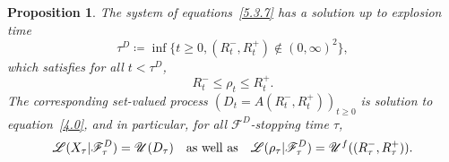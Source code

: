 \documentclass[JEP,XML,SOM,Unicode,NoFloatCountersInSection,published]{cedram}
\theoremstyle{plain}
\newtheorem{prop}[thm]{Proposition}
\theoremstyle{definition}
\newcommand{\SF}{{\mathscr F}}
\newcommand{\SL}{{\mathscr L}}
\newcommand{\SU}{{\mathscr U}}
\newcommand\df{\coloneqq}
\begin{document}
\begin{prop}
\label{P5.3.1}
The system of equations~\eqref{5.3.7} has a solution up to explosion time
\begin{equation}
\tau^D\df \inf\{t\ge 0, (R_t^-,R_t^+)\not\in (0,\infty)^2\},
\end{equation}
which satisfies for all $t<\tau^D$,
\begin{equation}
R_t^-\le\rho_t\le R_t^+.
\end{equation}
The corresponding set-valued process $(D_t=A(R_t^-,R_t^+))_{t\ge0}$ is solution to equation~\eqref{4.0}, and in particular, for all $\SF^D$-stopping time $\tau$,
\begin{equation}
\SL(X_\tau|\SF_\tau^D)=\SU(D_\tau)\quad\hbox{as well as}\quad \SL(\rho_\tau|\SF_\tau^D)=\SU^f((R_\tau^-,R_\tau^+)).
\end{equation}
\end{prop}
\end{document}
